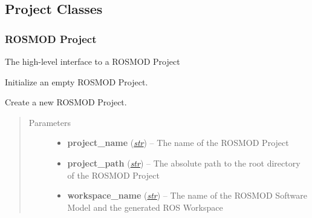 \documentclass[letterpaper,10pt,english]{sphinxmanual}
\begin{document}
\subsection{Project Classes}
\label{Library_Reference:project-classes}

\subsubsection{ROSMOD Project}
\label{class_Project::doc}\label{class_Project:rosmod-project}

\begin{fulllineitems}
\label{class_Project:ROSMOD_Project}
The high-level interface to a ROSMOD Project

\begin{fulllineitems}
\label{class_Project:ROSMOD_Project.__init__}
Initialize an empty ROSMOD Project.

\end{fulllineitems}


\begin{fulllineitems}
\label{class_Project:ROSMOD_Project.new}
Create a new ROSMOD Project.
\begin{quote}\begin{description}
\item[{Parameters}] \leavevmode\begin{itemize}
\item {} 
\textbf{project\_name} (\href{http://docs.python.org/library/functions.html\#str}{\emph{str}}) -- The name of the ROSMOD Project

\item {} 
\textbf{project\_path} (\href{http://docs.python.org/library/functions.html\#str}{\emph{str}}) -- The absolute path to the root directory of the ROSMOD Project

\item {} 
\textbf{workspace\_name} (\href{http://docs.python.org/library/functions.html\#str}{\emph{str}}) -- The name of the ROSMOD Software Model and the generated ROS Workspace


\end{itemize}
\end{description}
\end{quote}
\end{fulllineitems}
\end{fulllineitems}
\end{document}
